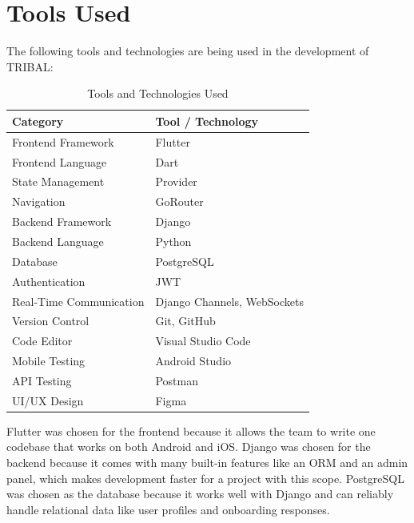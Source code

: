 \section{Tools Used}
The following tools and technologies are being used in the development of TRIBAL:
\begin{table}[H]
\centering
\begin{tabular}{|l|l|}
\hline
\textbf{Category} & \textbf{Tool / Technology} \\
\hline
Frontend Framework &  Flutter \\
Frontend Language &  Dart \\
State Management &  Provider \\
Navigation &  GoRouter \\
Backend Framework &  Django \\
Backend Language &  Python \\
Database &  PostgreSQL \\
Authentication &  JWT \\
Real-Time Communication &  Django Channels, WebSockets \\
Version Control &  Git, GitHub \\
Code Editor &  Visual Studio Code \\
Mobile Testing &  Android Studio \\
API Testing &  Postman \\
UI/UX Design &   Figma \\
\hline
\end{tabular}
\caption{Tools and Technologies Used}
\label{table:tools_used}
\end{table}
Flutter was chosen for the frontend because it allows the team to write one codebase that works on both Android and iOS. Django was chosen for the backend because it comes with many built-in features like an ORM and an admin panel, which makes development faster for a project with this scope. PostgreSQL was chosen as the database because it works well with Django and can reliably handle relational data like user profiles and onboarding responses.
